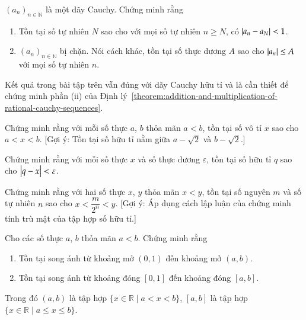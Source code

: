 \begin{exercise}
	${(a_{n})}_{n\in\mathbb{N}}$ là một dãy Cauchy. Chứng minh rằng
	\begin{enumerate}[label={(\roman*)}]
		\item Tồn tại số tự nhiên $N$ sao cho với mọi số tự nhiên $n\geq N$, có $\left\vert{a_{n} - a_{N}}\right\vert < 1$.
		\item ${(a_{n})}_{n\in\mathbb{N}}$ bị chặn. Nói cách khác, tồn tại số thực dương $A$ sao cho $\left\vert{a_{n}}\right\vert\leq A$ với mọi số tự nhiên $n$.
	\end{enumerate}
\end{exercise}

Kết quả trong bài tập trên vẫn đúng với dãy Cauchy hữu tỉ và là cần thiết để chứng minh phần (ii) của Định lý~\ref{theorem:addition-and-multiplication-of-rational-cauchy-sequences}.

\begin{exercise}
	Chứng minh rằng với mỗi số thực $a$, $b$ thỏa mãn $a < b$, tồn tại số vô tỉ $x$ sao cho $a < x < b$. [Gợi ý: Tồn tại số hữu tỉ nằm giữa $a - \sqrt{2}$ và $b - \sqrt{2}$.]
\end{exercise}

\begin{exercise}
	Chứng minh rằng với mỗi số thực $x$ và số thực dương $\varepsilon$, tồn tại số hữu tỉ $q$ sao cho $\left\vert{q - x}\right\vert < \varepsilon$.
\end{exercise}

\begin{exercise}
	Chứng minh rằng với hai số thực $x$, $y$ thỏa mãn $x < y$, tồn tại số nguyên $m$ và số tự nhiên $n$ sao cho $x < \dfrac{m}{2^{n}} < y$. [Gợi ý: Áp dụng cách lập luận của chứng minh tính trù mật của tập hợp số hữu tỉ.]
\end{exercise}

\begin{exercise}
	Cho các số thực $a$, $b$ thỏa mãn $a < b$. Chứng minh rằng
	\begin{enumerate}[label={(\roman*)}]
		\item Tồn tại song ánh từ khoảng mở $(0, 1)$ đến khoảng mở $(a, b)$.
		\item Tồn tại song ánh từ khoảng đóng $[0, 1]$ đến khoảng đóng $[a, b]$.
	\end{enumerate}

	Trong đó $(a, b)$ là tập hợp $\{ x\in\mathbb{R} \mid a < x < b \}$, $[a, b]$ là tập hợp $\{ x\in\mathbb{R} \mid a\leq x \leq b \}$.
\end{exercise}

